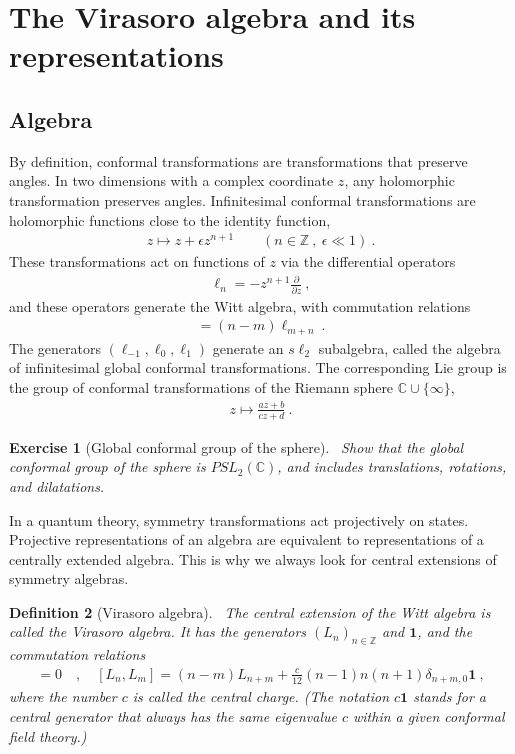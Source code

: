 \documentclass[12pt, a4paper]{article}
\theoremstyle{break}
\newtheorem{exo}{Exercise}[section]
\newtheorem{defn}[exo]{Definition}
\begin{document}
\section{The Virasoro algebra and its representations}

\subsection{Algebra}

By definition, conformal transformations are transformations that preserve angles. 
In two dimensions with a complex coordinate $z$, any holomorphic transformation preserves angles.
Infinitesimal conformal transformations are holomorphic functions close to the identity function, 
\begin{align}
 z \mapsto z + \epsilon z^{n+1}\qquad (n\in\mathbb{Z}\ , \ \epsilon\ll 1) \ .
\end{align}
These transformations act on functions of $z$ via the differential operators 
\begin{align}
 \ell_n = -z^{n+1}\frac{\partial}{\partial z}\ ,
\end{align}
and these operators generate the Witt algebra, with commutation relations
\begin{align}
 [\ell_n,\ell_m ] = (n-m)\ell_{m+n}\ .
\end{align}
The generators $(\ell_{-1},\ell_0,\ell_1)$ generate an $s\ell_2$ subalgebra, called the algebra of infinitesimal global conformal transformations.  The corresponding Lie group is the group of conformal transformations of 
the Riemann sphere $\mathbb{C}\cup \{\infty\}$,
\begin{align}
 z \mapsto \frac{az+b}{cz+d}\ .
\end{align}

\begin{exo}[Global conformal group of the sphere]
 ~\label{exo:sphere}
Show that the global conformal group of the sphere is $PSL_2(\mathbb{C})$, and includes translations, rotations, and dilatations. 
\end{exo}

In a quantum theory, symmetry transformations act projectively on states. 
Projective representations of an algebra are equivalent to representations of a centrally extended algebra. 
This is why we always look for central extensions of symmetry algebras.

\begin{defn}[Virasoro algebra]
 ~\label{def:vir}
 The central extension of the Witt algebra is called the Virasoro algebra. It has the generators $(L_n)_{n\in\mathbb{Z}}$ and $\mathbf 1$, and the commutation relations
 \begin{align}
  [\mathbf 1, L_n] = 0 \quad , \quad [L_n,L_m] = (n-m)L_{n+m} +\frac{c}{12}(n-1)n(n+1)\delta_{n+m,0}\mathbf 1 \ ,
  \label{eq:vir}
 \end{align}
 where the number $c$ is called the central charge. (The notation $c\mathbf 1$ stands for a central generator that always has the same eigenvalue $c$ within a given conformal field theory.)
\end{defn}
\end{document}
